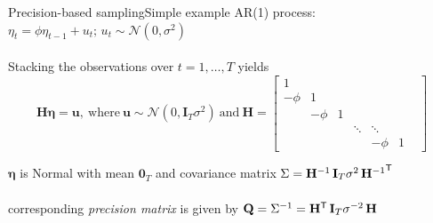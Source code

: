 \documentclass[xcolor=svgnames, 10pt, aspectratio=169]{beamer}
\newcommand\transpose[1]{{#1}^{\sf{T}}}
\begin{document}
\begin{frame}{Precision-based sampling}{Simple example}
AR(1) process: $\eta_t = \phi \eta_{t-1} + u_t; \, u_t \sim \mathcal{N}(0, \sigma^2)$ \\~\\

Stacking the observations over $t = 1, \dots, T$ yields 
$$
\mathbf{H} \boldsymbol{\eta} = \mathbf{u}, \: \text{where} \: \mathbf{u} \sim \mathcal{N}(0, \mathbf{I}_T \sigma^2) \: \text{and} \:
\mathbf{H} = 
\left[
\begin{smallmatrix}
1 &  &  &  &  \\
-\phi & 1 &  &  &  \\
 & -\phi & 1 &  &  \\
 &  & & \ddots & \ddots &  & \\
 &  &  &  & -\phi & 1
\end{smallmatrix}
\right]
$$ \medskip


$\boldsymbol{\eta}$ is Normal with mean $\mathbf{0}_T$ and covariance matrix $\Sigma = \mathbf{H}^{-1} \, \mathbf{I}_T\sigma^{2} \, \transpose{\mathbf{H}^{-1}}$ \\~\\

corresponding \textit{precision matrix} is given by $\mathbf{Q} = \Sigma^{-1} = \transpose{\mathbf{H}} \, \mathbf{I}_T\sigma^{-2} \, \mathbf{H}$
\end{frame}
\end{document}
